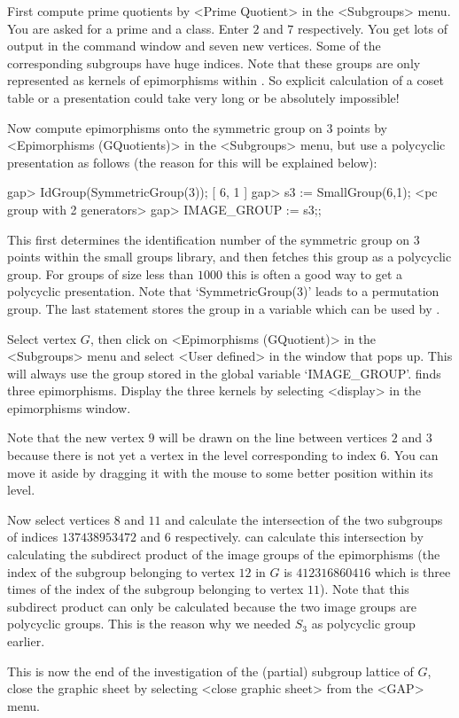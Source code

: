 First compute prime quotients by <Prime Quotient> in the <Subgroups>
menu. You are asked for a prime and a class. Enter $2$ and $7$
respectively. You get lots of output in the {\GAP} command window and
seven new vertices. Some of the corresponding subgroups have huge
indices. Note that these groups are only represented as kernels of
epimorphisms within {\GAP}. So explicit calculation of a coset table
or a presentation could take very long or be absolutely impossible!

Now compute epimorphisms onto the symmetric group on $3$ points by
<Epimorphisms (GQuotients)> in the <Subgroups> menu, but use a polycyclic 
presentation as follows (the reason for this will be explained below):

\begintt
gap> IdGroup(SymmetricGroup(3));
[ 6, 1 ]
gap> s3 := SmallGroup(6,1);
<pc group with 2 generators>
gap> IMAGE_GROUP := s3;;
\endtt

This first determines the identification number of the symmetric group 
on $3$ points within the small groups library, and then fetches this
group as a polycyclic group. For groups of size less than $1000$ this
is often a good way to get a polycyclic presentation. Note that
`SymmetricGroup(3)' leads to a permutation group. The last statement
stores the group in a variable which can be used by {\XGAP}. 

Select vertex $G$, then click on <Epimorphisms (GQuotient)> in the
<Subgroups> menu and select <User defined> in the window that pops up.
This will always use the group stored in the global variable
`IMAGE_GROUP'. {\GAP} finds three epimorphisms. Display the three
kernels by selecting <display> in the epimorphisms window.

Note that the new vertex $9$ will be drawn on the line between
vertices $2$ and $3$ because there is not yet a vertex in the level
corresponding to index 6. You can move it aside by dragging it with
the mouse to some better position within its level.

Now select vertices $8$ and $11$ and calculate the intersection of the 
two subgroups of indices $137438953472$ and $6$ respectively. {\GAP}
can calculate this intersection by calculating the subdirect product
of the image groups of the epimorphisms (the index of the subgroup
belonging to vertex $12$ in $G$ is $412316860416$ which is three times
of the index of the subgroup belonging to vertex $11$). Note that this 
subdirect product can only be calculated because the two image groups
are polycyclic groups. This is the reason why we needed $S_3$ as
polycyclic group earlier.

This is  now   the end  of the investigation   of  the (partial) subgroup
lattice of $G$,  close the graphic  sheet  by selecting <close  graphic
sheet> from the <GAP> menu.

